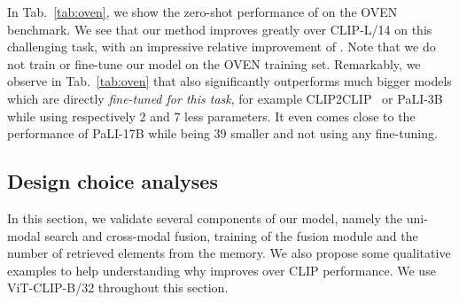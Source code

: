 In Tab.~\ref{tab:oven}, we show the zero-shot performance of \OURS on the OVEN benchmark.
We see that our method improves greatly over CLIP-L/14 on this challenging task, with an impressive relative improvement of .
Note that we do not train or fine-tune our model on the OVEN training set. 
Remarkably, we observe in Tab.~\ref{tab:oven} that \OURS also significantly outperforms much bigger models which are directly \emph{fine-tuned for this task}, for example CLIP2CLIP~\cite{hu2023open} or PaLI-3B~\cite{pali2022} while using respectively 2  and 7  less parameters.
It even comes close to the performance of PaLI-17B while being 39  smaller and not using any fine-tuning.



\subsection{Design choice analyses}
\vspace{-0.2cm}
In this section, we validate several components of our model, namely the uni-modal search and cross-modal fusion, training of the fusion module and the number of retrieved elements from the memory.
We also propose some qualitative examples to help understanding why \OURS improves over CLIP performance.
We use ViT-CLIP-B/32 throughout this section.

